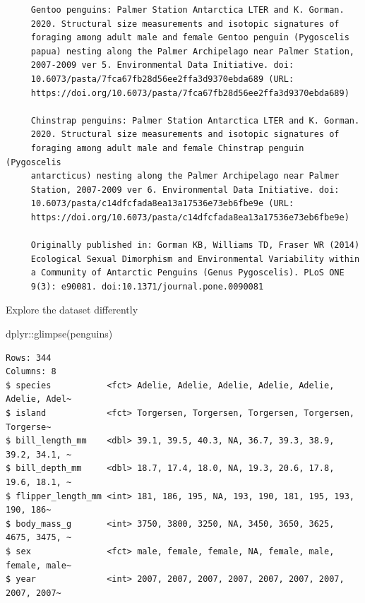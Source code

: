 \documentclass[
  letterpaper,
  DIV=11,
  numbers=noendperiod]{scrreprt}
\newenvironment{Shaded}{\begin{snugshade}}{\end{snugshade}}
\newcommand{\FunctionTok}[1]{\textcolor[rgb]{0.28,0.35,0.67}{#1}}
\newcommand{\NormalTok}[1]{\textcolor[rgb]{0.00,0.23,0.31}{#1}}
\newcommand{\SpecialCharTok}[1]{\textcolor[rgb]{0.37,0.37,0.37}{#1}}
\begin{document}
\begin{verbatim}
     Gentoo penguins: Palmer Station Antarctica LTER and K. Gorman.
     2020. Structural size measurements and isotopic signatures of
     foraging among adult male and female Gentoo penguin (Pygoscelis
     papua) nesting along the Palmer Archipelago near Palmer Station,
     2007-2009 ver 5. Environmental Data Initiative. doi:
     10.6073/pasta/7fca67fb28d56ee2ffa3d9370ebda689 (URL:
     https://doi.org/10.6073/pasta/7fca67fb28d56ee2ffa3d9370ebda689)

     Chinstrap penguins: Palmer Station Antarctica LTER and K. Gorman.
     2020. Structural size measurements and isotopic signatures of
     foraging among adult male and female Chinstrap penguin (Pygoscelis
     antarcticus) nesting along the Palmer Archipelago near Palmer
     Station, 2007-2009 ver 6. Environmental Data Initiative. doi:
     10.6073/pasta/c14dfcfada8ea13a17536e73eb6fbe9e (URL:
     https://doi.org/10.6073/pasta/c14dfcfada8ea13a17536e73eb6fbe9e)

     Originally published in: Gorman KB, Williams TD, Fraser WR (2014)
     Ecological Sexual Dimorphism and Environmental Variability within
     a Community of Antarctic Penguins (Genus Pygoscelis). PLoS ONE
     9(3): e90081. doi:10.1371/journal.pone.0090081
\end{verbatim}

Explore the dataset differently

\begin{Shaded}
\begin{Highlighting}[]
\NormalTok{dplyr}\SpecialCharTok{::}\FunctionTok{glimpse}\NormalTok{(penguins)}
\end{Highlighting}
\end{Shaded}

\begin{verbatim}
Rows: 344
Columns: 8
$ species           <fct> Adelie, Adelie, Adelie, Adelie, Adelie, Adelie, Adel~
$ island            <fct> Torgersen, Torgersen, Torgersen, Torgersen, Torgerse~
$ bill_length_mm    <dbl> 39.1, 39.5, 40.3, NA, 36.7, 39.3, 38.9, 39.2, 34.1, ~
$ bill_depth_mm     <dbl> 18.7, 17.4, 18.0, NA, 19.3, 20.6, 17.8, 19.6, 18.1, ~
$ flipper_length_mm <int> 181, 186, 195, NA, 193, 190, 181, 195, 193, 190, 186~
$ body_mass_g       <int> 3750, 3800, 3250, NA, 3450, 3650, 3625, 4675, 3475, ~
$ sex               <fct> male, female, female, NA, female, male, female, male~
$ year              <int> 2007, 2007, 2007, 2007, 2007, 2007, 2007, 2007, 2007~
\end{verbatim}
\end{document}
